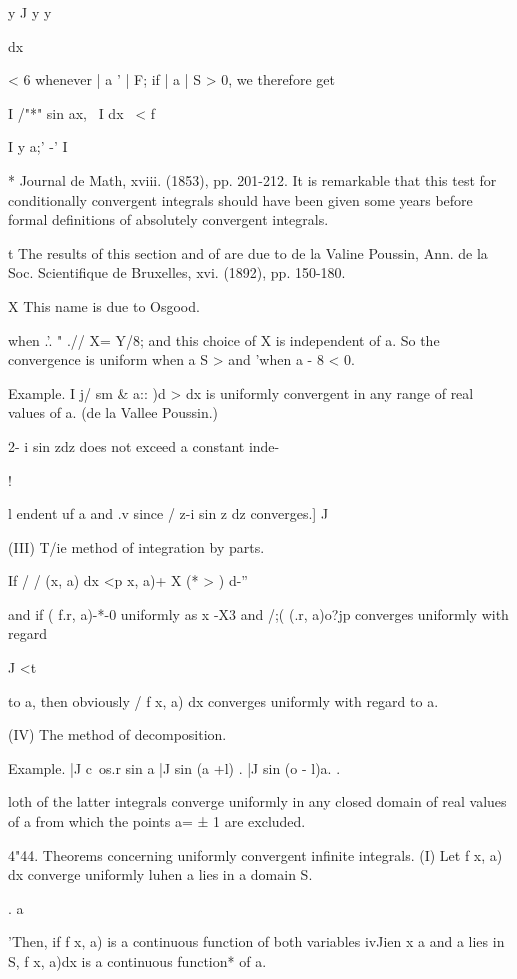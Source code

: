 y J y y

dx

< 6 whenever | a ' | F; if | a | S > 0, we therefore get

I /"*" sin ax, \ I dx \ < f

I y a;' -' I

* Journal de Math, xviii. (1853), pp. 201-212. It is remarkable that
this test for conditionally convergent integrals should have been
given some years before formal definitions of absolutely convergent
integrals.

t The results of this section and of are due to de la Valine
Poussin, Ann. de la Soc. Scientifique de Bruxelles, xvi. (1892), pp.
150-180.

X This name is due to Osgood.

%
%

when .'. " .// X= Y/8; and this choice of X is independent of a. So
the convergence is uniform when a S > and 'when a - 8 < 0.

Example. I j/ sm \& a:: )d > dx is uniformly convergent in any range
of real values of a. (de la Vallee Poussin.)

2- i sin zdz does not exceed a constant inde-

!

l endent uf a and .v since / z-i sin z dz converges.] J

(III) T/ie method of integration by parts.

If / / (x, a) dx <p x, a)+ X (* > ) d-''

and if ( f.r, a)-*-0 uniformly as x -X3 and /;( (.r, a)o?jp converges
uniformly with regard

J <t

to a, then obviously / f x, a) dx converges uniformly with regard to
a.

(IV) The method of decomposition.

Example. |J c\ os.r sin a |J sin (a +l) . |J sin (o - l)a. .

loth of the latter integrals converge uniformly in any closed domain
of real values of a from which the points a= ± 1 are excluded.

4"44. Theorems concerning uniformly convergent infinite integrals. (I)
Let f x, a) dx converge uniformly luhen a lies in a domain S.

. a

'Then, if f x, a) is a continuous function of both variables ivJien x
a and a lies in S, f x, a)dx is a continuous function* of a.

